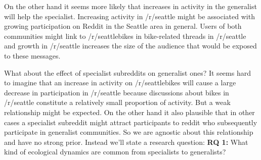 \documentclass[12pt]{memoir}
\begin{document}
On the other hand it seems more likely that increases in activity in the generalist will help the specialist.  Increasing activity in /r/seattle might be associated with growing participation on Reddit in the Seattle area in general.  Users of both communities might link to /r/seattlebikes in bike-related threads in /r/seattle and growth in /r/seattle increases the size of the audience that would be exposed to these messages.

What about the effect of specialist subreddits on generalist ones?  It seems hard to imagine that an increase in activity on /r/seattlebikes will cause a large decrease in participation in /r/seattle because discussions about bikes in /r/seattle constitute a relatively small proportion of activity.  But a weak relationship might be expected.  On the other hand it also plausible that in other cases a specialist subreddit might attract participants to reddit who subsequently participate in generalist communities. So we are agnostic about this relationship and have no strong prior.  Instead we'll state a research question: \textbf{RQ 1:} What kind of ecological dynamics are common from specialists to generalists?
\end{document}
